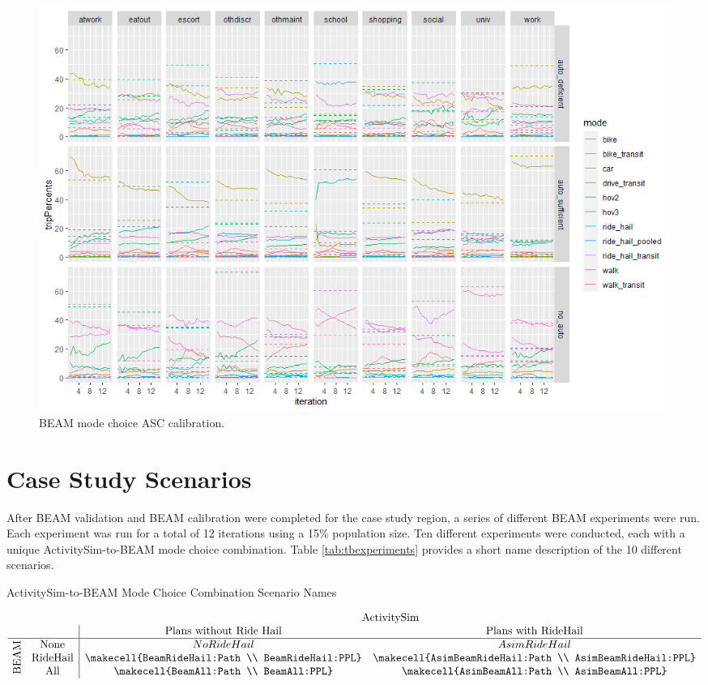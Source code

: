 \documentclass[12pt, oneside, openright]{byuthesis}
\begin{document}
\begin{figure}

{\centering \includegraphics[width=1\linewidth]{pics/BeamCalib} 

}

\caption{BEAM mode choice ASC calibration.}\label{fig:fig-beam-calib}
\end{figure}

\hypertarget{meth-scenarios}{%
\section{Case Study Scenarios}\label{meth-scenarios}}

After BEAM validation and BEAM calibration were completed for the case study region, a series of different BEAM experiments were run. Each experiment was run for a total of 12 iterations using a 15\% population size. Ten different experiments were conducted, each with a unique ActivitySim-to-BEAM mode choice combination. Table \ref{tab:tbexperiments} provides a short name description of the 10 different scenarios.

\begin{table}
\caption{ActivitySim-to-BEAM Mode Choice Combination Scenario Names}
\renewcommand{\arraystretch}{2}
\[
  \begin{array}{cc|ccc}
    &\multicolumn{1}{c}{} & \multicolumn{2}{c}{\text{ActivitySim}} \\
    && \text{Plans without Ride Hail} & \text{Plans with RideHail}\\
    \hline
    & \text{None} & No RideHail & AsimRideHail \\
    \smash{\rotatebox[origin=c]{90}{\text{BEAM}}} & \text{RideHail} & \makecell{BeamRideHail:Path \\ BeamRideHail:PPL} & \makecell{AsimBeamRideHail:Path \\ AsimBeamRideHail:PPL} \\
    & \text{All} & \makecell{BeamAll:Path \\ BeamAll:PPL} & \makecell{AsimBeamAll:Path \\ AsimBeamAll:PPL}
  \end{array}
\]
\label{tab:tbexperiments}
\end{table}
\end{document}
